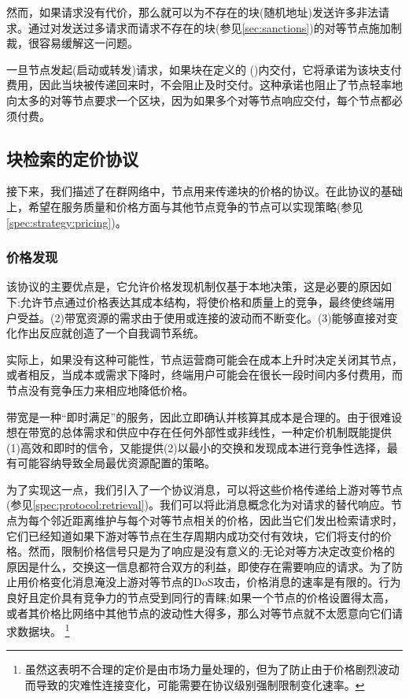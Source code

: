 然而，如果请求没有代价，那么就可以为不存在的块(随机地址)发送许多非法请求。通过对发送过多请求而请求不存在的块(参见\ref{sec:sanctions})的对等节点施加制裁，很容易缓解这一问题。

一旦节点发起(启动或转发)请求，如果块在定义的 ()内交付，它将承诺为该块支付费用，因此当块被传递回来时，不会阻止及时交付。这种承诺也阻止了节点轻率地向太多的对等节点要求一个区块，因为如果多个对等节点响应交付，每个节点都必须付费。


\subsection{块检索的定价协议\statusgreen}\label{sec:pricing}

\green{}

接下来，我们描述了在群网络中，节点用来传递块的价格的协议。在此协议的基础上，希望在服务质量和价格方面与其他节点竞争的节点可以实现策略(参见\ref{spec:strategy:pricing})。 

\subsubsection{价格发现}\label{sec:retrieval-price-discovery}

该协议的主要优点是，它允许价格发现机制仅基于本地决策，这是必要的原因如下:允许节点通过价格表达其成本结构，将使价格和质量上的竞争，最终使终端用户受益。(2)带宽资源的需求由于使用或连接的波动而不断变化。(3)能够直接对变化作出反应就创造了一个自我调节系统。

实际上，如果没有这种可能性，节点运营商可能会在成本上升时决定关闭其节点，或者相反，当成本或需求下降时，终端用户可能会在很长一段时间内多付费用，而节点没有竞争压力来相应地降低价格。

带宽是一种“即时满足”的服务，因此立即确认并核算其成本是合理的。由于很难设想在带宽的总体需求和供应中存在任何外部性或非线性，一种定价机制既能提供(1)高效和即时的信令，又能提供(2)以最小的交换和发现成本进行竞争性选择，最有可能容纳导致全局最优资源配置的策略。

为了实现这一点，我们引入了一个协议消息，可以将这些价格传递给上游对等节点(参见\ref{spec:protocol:retrieval})。我们可以将此消息概念化为对请求的替代响应。节点为每个邻近距离维护与每个对等节点相关的价格，因此当它们发出检索请求时，它们已经知道如果下游对等节点在生存周期内成功交付有效块，它们将支付的价格。然而，限制价格信号只是为了响应是没有意义的:无论对等方决定改变价格的原因是什么，交换这一信息都符合双方的利益，即使存在需要响应的请求。为了防止用价格变化消息淹没上游对等节点的DoS攻击，价格消息的速率是有限的。行为良好且定价具有竞争力的节点受到同行的青睐;如果一个节点的价格设置得太高，或者其价格比网络中其他节点的波动性大得多，那么对等节点就不太愿意向它们请求数据块。%
%
\footnote{虽然这表明不合理的定价是由市场力量处理的，但为了防止由于价格剧烈波动而导致的灾难性连接变化，可能需要在协议级别强制限制变化速率。 }

